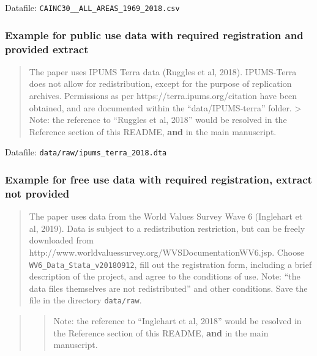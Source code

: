 \documentclass[
]{article}
\begin{document}
Datafile: \texttt{CAINC30\_\_ALL\_AREAS\_1969\_2018.csv}

\hypertarget{example-for-public-use-data-with-required-registration-and-provided-extract}{%
\subsubsection{Example for public use data with required registration
and provided
extract}\label{example-for-public-use-data-with-required-registration-and-provided-extract}}

\begin{quote}
The paper uses IPUMS Terra data (Ruggles et al, 2018). IPUMS-Terra does
not allow for redistribution, except for the purpose of replication
archives. Permissions as per https://terra.ipums.org/citation have been
obtained, and are documented within the ``data/IPUMS-terra'' folder.
\textgreater{} Note: the reference to ``Ruggles et al, 2018'' would be
resolved in the Reference section of this README, \textbf{and} in the
main manuscript.
\end{quote}

Datafile: \texttt{data/raw/ipums\_terra\_2018.dta}

\hypertarget{example-for-free-use-data-with-required-registration-extract-not-provided}{%
\subsubsection{Example for free use data with required registration,
extract not
provided}\label{example-for-free-use-data-with-required-registration-extract-not-provided}}

\begin{quote}
The paper uses data from the World Values Survey Wave 6 (Inglehart et
al, 2019). Data is subject to a redistribution restriction, but can be
freely downloaded from
http://www.worldvaluessurvey.org/WVSDocumentationWV6.jsp. Choose
\texttt{WV6\_Data\_Stata\_v20180912}, fill out the registration form,
including a brief description of the project, and agree to the
conditions of use. Note: ``the data files themselves are not
redistributed'' and other conditions. Save the file in the directory
\texttt{data/raw}.
\end{quote}

\begin{quote}
\begin{quote}
Note: the reference to ``Inglehart et al, 2018'' would be resolved in
the Reference section of this README, \textbf{and} in the main
manuscript.
\end{quote}
\end{quote}
\end{document}
